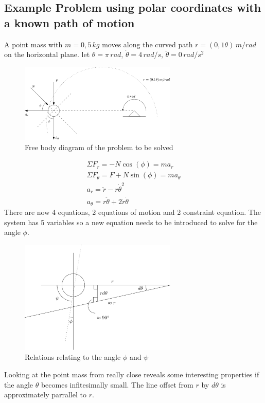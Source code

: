 \documentclass[11pt, a4paper]{article}
\begin{document}
\subsection{Example Problem using polar coordinates with a known path of motion}
A point mass with $m = 0,5\,kg$ moves along the curved path $r = (0,1\theta)\,m/rad$ on the horizontal plane.
let $\theta = \pi\,rad$, $\dot{\theta} = 4\,rad/s$, $\ddot{\theta} = 0\,rad/s^2$
\begin{figure}[h]
    \centerline{\includegraphics[width=7.5cm]{images/FBD_Known_motion.png}}
    \caption{Free body diagram of the problem to be solved}
\end{figure}
\setcounter{equation}{0}
\begin{gather}
    \Sigma F_r = -N\cos(\phi) = ma_r\\
    \Sigma F_\theta = F + N\sin(\phi) = ma_\theta\\
    a_r = \ddot{r} - r\dot{\theta}^2 \\
    a_\theta = r\ddot{\theta} + 2\dot{r}\dot{\theta}
\end{gather}
There are now 4 equations, 2 equations of motion and 2 constraint equation. The system has 5 variables
so a new equation needs to be introduced to solve for the angle $\phi$.
\begin{figure}[h]
    \centerline{\includegraphics[width=7.5cm]{images/infitesimal_geometry.png}}
    \caption{Relations relating to the angle $\phi$ and $\psi$}
\end{figure}
Looking at the point mass from really close reveals some interesting properties if the angle $\theta$ 
becomes infitesimally small. The line offset from $r$ by $d\theta$ is approximately parrallel to $r$.
\end{document}
